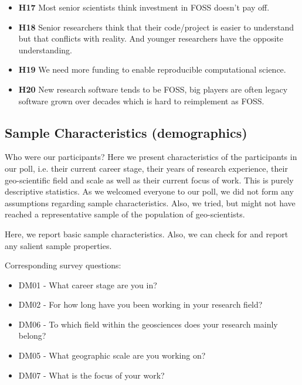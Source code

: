 \documentclass{article}
\begin{document}
\begin{itemize}
 	\item \textbf{H17} Most senior scientists think investment in FOSS doesn’t pay off. 
 	\item \textbf{H18} Senior researchers think that their code/project is easier to understand but that conflicts with reality. And younger researchers have the opposite understanding. 
 	\item \textbf{H19} We need more funding to enable reproducible computational science. 
 	\item \textbf{H20} New research software tends to be FOSS, big players are often legacy software grown over decades which is hard to reimplement as FOSS. 
\end{itemize}

\subsection{Sample Characteristics (demographics)}
Who were our participants?
Here we present characteristics of the participants in our poll, i.e. their current career stage, their years of research experience, their geo-scientific field and scale as well as their current focus of work.
This is purely descriptive statistics.
As we welcomed everyone to our poll, we did not form any assumptions regarding sample characteristics.
Also, we tried, but might not have reached a representative sample of the population of geo-scientists.

Here, we report basic sample characteristics. Also, we can check for and report any salient sample properties.

Corresponding survey questions:

\begin{itemize}
	\item DM01 - What career stage are you in?
	\item DM02 - For how long have you been working in your research field?
	\item DM06 - To which field within the geosciences does your research mainly belong?
	\item DM05 - What geographic scale are you working on?
	\item DM07 - What is the focus of your work?
\end{itemize}
\end{document}
